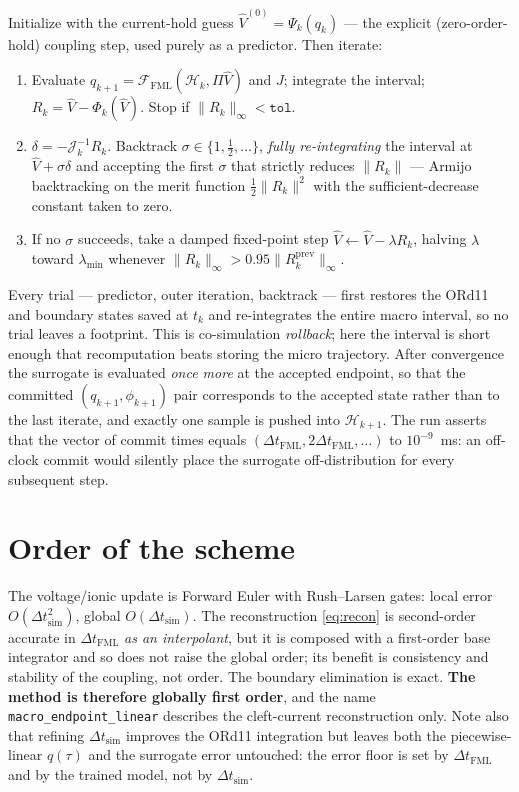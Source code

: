 \documentclass[11pt]{article}
\newcommand{\FML}{\mathcal{F}_{\mathrm{FML}}}
\newcommand{\dtF}{\Delta t_{\mathrm{FML}}}
\newcommand{\dtS}{\Delta t_{\mathrm{sim}}}
\begin{document}
Initialize with the current-hold guess $\widehat V^{(0)}=\Psi_k(q_k)$ --- the
explicit (zero-order-hold) coupling step, used purely as a predictor. Then
iterate:

\begin{enumerate}[leftmargin=1.6em]
\item Evaluate $q_{k+1}=\FML(\mathcal H_k,\Pi\widehat V)$ and $J$; integrate the interval;
 $R_k=\widehat V-\Phi_k(\widehat V)$. Stop if $\|R_k\|_\infty<\texttt{tol}$.
\item $\delta=-\mathcal J_k^{-1}R_k$. Backtrack $\sigma\in\{1,\tfrac12,\dots\}$,
 \emph{fully re-integrating} the interval at $\widehat V+\sigma\delta$ and
 accepting the first $\sigma$ that strictly reduces $\|R_k\|$ --- Armijo
 backtracking on the merit function $\tfrac12\|R_k\|^2$ with the
 sufficient-decrease constant taken to zero.
\item If no $\sigma$ succeeds, take a damped fixed-point step
 $\widehat V\leftarrow\widehat V-\lambda R_k$, halving
 $\lambda$ toward $\lambda_{\min}$ whenever
 $\|R_k\|_\infty>0.95\|R_k^{\mathrm{prev}}\|_\infty$.
\end{enumerate}

Every trial --- predictor, outer iteration, backtrack --- first restores the
ORd11 and boundary states saved at $t_k$ and re-integrates the entire macro
interval, so no trial leaves a footprint. This is co-simulation \emph{rollback}; here the interval is short enough that recomputation beats
storing the micro trajectory. After convergence the surrogate is evaluated
\emph{once more} at the accepted endpoint, so that the committed
$(q_{k+1},\phi_{k+1})$ pair corresponds to the accepted state rather than to the
last iterate, and exactly one sample is pushed into $\mathcal H_{k+1}$. The run
asserts that the vector of commit times equals $(\dtF,2\dtF,\dots)$ to
$10^{-9}$~ms: an off-clock commit would silently place the surrogate
off-distribution for every subsequent step.

\section{Order of the scheme}

The voltage/ionic update is Forward Euler with Rush--Larsen gates: local error
$O(\dtS^2)$, global $O(\dtS)$. The
reconstruction \eqref{eq:recon} is second-order accurate in $\dtF$ \emph{as an
interpolant}, but it is composed with a first-order base integrator and so does
not raise the global order; its benefit is consistency and stability of the
coupling, not order. The boundary elimination is exact.
\textbf{The method is therefore globally first order}, and the name
\texttt{macro\_endpoint\_linear} describes the cleft-current reconstruction
only. Note also that refining $\dtS$ improves the ORd11 integration but leaves
both the piecewise-linear $q(\tau)$ and the surrogate error untouched: the error
floor is set by $\dtF$ and by the trained model, not by $\dtS$.
\end{document}
